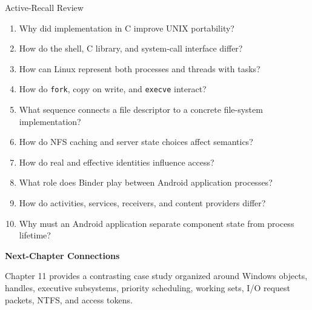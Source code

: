 \documentclass[10pt,letterpaper]{article}
\begin{document}
\enlargethispage{2\baselineskip}
\begin{studybox}{Active-Recall Review}
\small
\begin{enumerate}
  \item Why did implementation in C improve UNIX portability?
  \item How do the shell, C library, and system-call interface differ?
  \item How can Linux represent both processes and threads with tasks?
  \item How do \texttt{fork}, copy on write, and \texttt{execve} interact?
  \item What sequence connects a file descriptor to a concrete file-system implementation?
  \item How do NFS caching and server state choices affect semantics?
  \item How do real and effective identities influence access?
  \item What role does Binder play between Android application processes?
  \item How do activities, services, receivers, and content providers differ?
  \item Why must an Android application separate component state from process lifetime?
\end{enumerate}
\end{studybox}

\par\medskip
{\color{navy}\bfseries Next-Chapter Connections}\par\smallskip
Chapter 11 provides a contrasting case study organized around Windows objects, handles, executive subsystems, priority scheduling, working sets, I/O request packets, NTFS, and access tokens.
\normalsize
\end{document}
